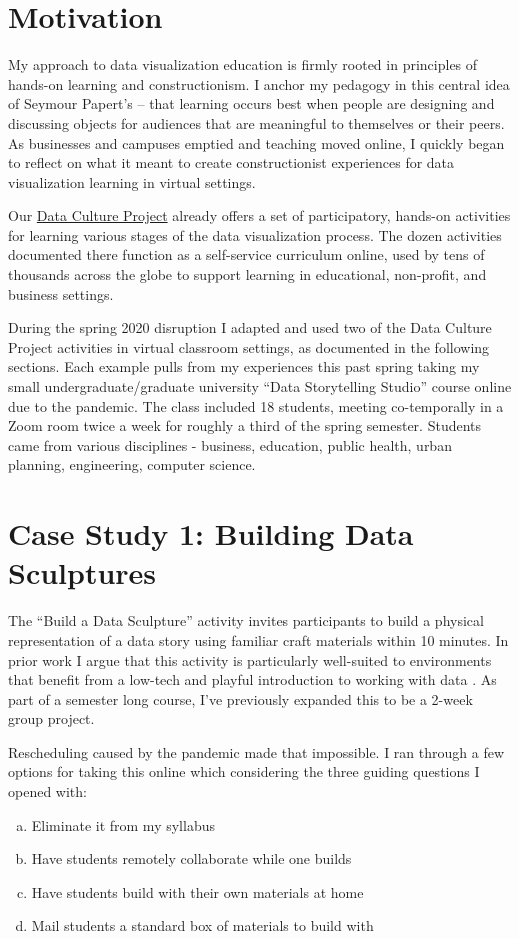 \documentclass[journal]{vgtc}                %
\begin{document}
\section{Motivation}
My approach to data visualization education is firmly rooted in principles of hands-on learning and constructionism\cite{dignazio_creative_2018}. I anchor my pedagogy in this central idea of Seymour Papert’s – that learning occurs best when people are designing and discussing objects for audiences that are meaningful to themselves or their peers\cite{papert_childrens_1994}. As businesses and campuses emptied and teaching moved online, I quickly began to reflect on what it meant to create constructionist experiences for data visualization learning in virtual settings.

Our \href{https://datacultureproject.org}{Data Culture Project} already offers a  set of participatory, hands-on activities for learning various stages of the data visualization process. The dozen activities documented there function as a self-service curriculum online, used by tens of thousands across the globe to support learning in educational, non-profit, and business settings. 

During the spring 2020 disruption I adapted and used two of the Data Culture Project activities in virtual classroom settings, as documented in the following sections. Each example pulls from my experiences this past spring taking my small undergraduate/graduate university “Data Storytelling Studio” course online due to the pandemic. The class included 18 students, meeting co-temporally in a Zoom room twice a week for roughly a third of the spring semester. Students came from various disciplines - business, education, public health, urban planning, engineering, computer science.

\section{Case Study 1: Building Data Sculptures}
The “Build a Data Sculpture” activity invites participants to build a physical representation of a data story using familiar craft materials within 10 minutes. In prior work I argue that this activity is particularly well-suited to environments that benefit from a low-tech and playful introduction to working with data \cite{bhargava_data_2017}. As part of a semester long course, I've previously expanded this to be a 2-week group project.

Rescheduling caused by the pandemic made that impossible. I ran through a few options for taking this online which considering the three guiding questions I opened with:
\begin{enumerate}[(a)] %
  \itemsep0em 
  \item Eliminate it from my syllabus
  \item Have students remotely collaborate while one builds
  \item Have students build with their own materials at home
  \item Mail students a standard box of materials to build with
\end{enumerate}
\end{document}
